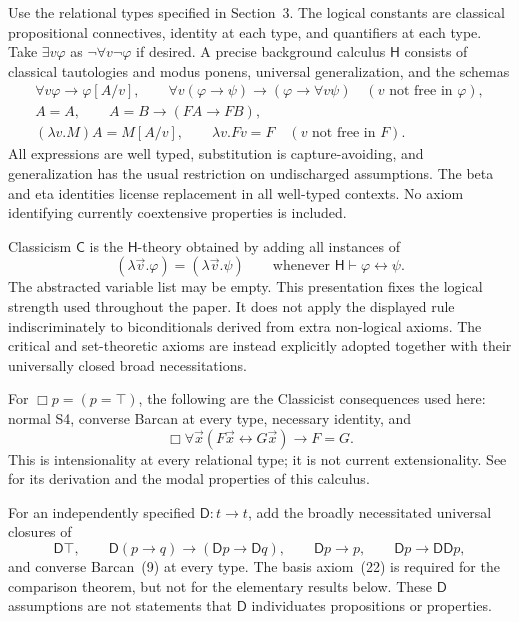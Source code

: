 \documentclass[11pt]{article}
\theoremstyle{definition}
\newcommand{\D}{\mathsf D}
\newcommand{\C}{\mathsf C}
\numberwithin{equation}{section}
\begin{document}
Use the relational types specified in Section~3. The logical constants are classical propositional connectives, identity at each type, and quantifiers at each type. Take $\exists v\varphi$ as $\neg\forall v\neg\varphi$ if desired. A precise background calculus $\mathsf H$ consists of classical tautologies and modus ponens, universal generalization, and the schemas
$$
\begin{gathered}
\forall v\varphi\rightarrow\varphi[A/v],\qquad
\forall v(\varphi\rightarrow\psi)\rightarrow(\varphi\rightarrow\forall v\psi)
   \quad(v\text{ not free in }\varphi),\\
A=A,\qquad A=B\rightarrow(FA\rightarrow FB),\\
(\lambda v.M)A=M[A/v],\qquad \lambda v.Fv=F
   \quad(v\text{ not free in }F).
\end{gathered}
$$
All expressions are well typed, substitution is capture-avoiding, and generalization has the usual restriction on undischarged assumptions. The beta and eta identities license replacement in all well-typed contexts. No axiom identifying currently coextensive properties is included.

Classicism $\C$ is the $\mathsf H$-theory obtained by adding all instances of
\begin{equation}\label{eq:logical-equivalence}
(\lambda\vec v.\varphi)=(\lambda\vec v.\psi)
\qquad\text{whenever }\mathsf H\vdash\varphi\leftrightarrow\psi.
\end{equation}
The abstracted variable list may be empty. This presentation fixes the logical strength used throughout the paper. It does not apply the displayed rule indiscriminately to biconditionals derived from extra non-logical axioms. The critical and set-theoretic axioms are instead explicitly adopted together with their universally closed broad necessitations.

For $\Box p=(p=\top)$, the following are the Classicist consequences used here: normal S4, converse Barcan at every type, necessary identity, and
\begin{equation}\label{eq:intensionality}
\Box\forall\vec x(F\vec x\leftrightarrow G\vec x)\rightarrow F=G.
\end{equation}
This is intensionality at every relational type; it is not current extensionality. See \citet[\S\S1.3--1.5]{BD} for its derivation and the modal properties of this calculus.

For an independently specified $\D :t\to t$, add the broadly necessitated universal closures of
$$
\D \top,\qquad \D (p\rightarrow q)\rightarrow(\D p\rightarrow \D q),\qquad
\D p\rightarrow p,\qquad \D p\rightarrow \D \D p,
$$
and converse Barcan~\textup{(9)} at every type. The basis axiom~\textup{(22)} is required for the comparison theorem, but not for the elementary results below. These $\D $ assumptions are not statements that $\D $ individuates propositions or properties.
\end{document}
